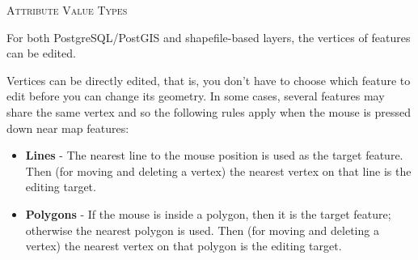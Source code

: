 
\begin{Tip}[ht]\caption{\textsc{Attribute Value Types}}
\end{Tip}

%
%
%
%
%


For both PostgreSQL/PostGIS and shapefile-based layers, the vertices of features can be edited. 

Vertices can be directly edited, that is, you don't
have to choose which feature to edit before you can change
its geometry.
In some cases, several features may share the same vertex
and so the following rules apply when the mouse is pressed
down near map features:

\begin{itemize}
\item \textbf{Lines}    - The nearest line to the mouse position
                          is used as the target feature.
                          Then (for moving and deleting a vertex)
                          the nearest vertex
                          on that line is the editing target.

\item \textbf{Polygons} - If the mouse is inside a polygon, then it is
                          the target feature; otherwise the nearest polygon
                          is used.
                          Then (for moving and deleting a vertex)
                          the nearest vertex
                          on that polygon is the editing target.
\end{itemize}

